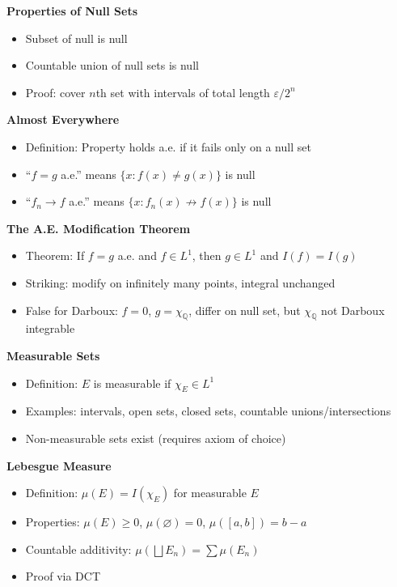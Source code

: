 \documentclass[
  10pt,
  letterpaper,
]{scrbook}
\providecommand{\tightlist}{%
  \setlength{\itemsep}{0pt}\setlength{\parskip}{0pt}}
\begin{document}
\textbf{Properties of Null Sets}

\begin{itemize}
\tightlist
\item
  Subset of null is null
\item
  Countable union of null sets is null
\item
  Proof: cover \(n\)th set with intervals of total length
  \(\varepsilon / 2^n\)
\end{itemize}

\textbf{Almost Everywhere}

\begin{itemize}
\tightlist
\item
  Definition: Property holds a.e. if it fails only on a null set
\item
  ``\(f = g\) a.e.'' means \(\{x : f(x) \neq g(x)\}\) is null
\item
  ``\(f_n \to f\) a.e.'' means \(\{x : f_n(x) \not\to f(x)\}\) is null
\end{itemize}

\textbf{The A.E. Modification Theorem}

\begin{itemize}
\tightlist
\item
  Theorem: If \(f = g\) a.e. and \(f \in L^1\), then \(g \in L^1\) and
  \(I(f) = I(g)\)
\item
  Striking: modify on infinitely many points, integral unchanged
\item
  False for Darboux: \(f = 0\), \(g = \chi_{\mathbb{Q}}\), differ on
  null set, but \(\chi_{\mathbb{Q}}\) not Darboux integrable
\end{itemize}

\textbf{Measurable Sets}

\begin{itemize}
\tightlist
\item
  Definition: \(E\) is measurable if \(\chi_E \in L^1\)
\item
  Examples: intervals, open sets, closed sets, countable
  unions/intersections
\item
  Non-measurable sets exist (requires axiom of choice)
\end{itemize}

\textbf{Lebesgue Measure}

\begin{itemize}
\tightlist
\item
  Definition: \(\mu(E) = I(\chi_E)\) for measurable \(E\)
\item
  Properties: \(\mu(E) \geq 0\), \(\mu(\varnothing) = 0\),
  \(\mu([a,b]) = b - a\)
\item
  Countable additivity:
  \(\mu\left( \bigsqcup E_n \right) = \sum \mu(E_n)\)
\item
  Proof via DCT
\end{itemize}
\end{document}
